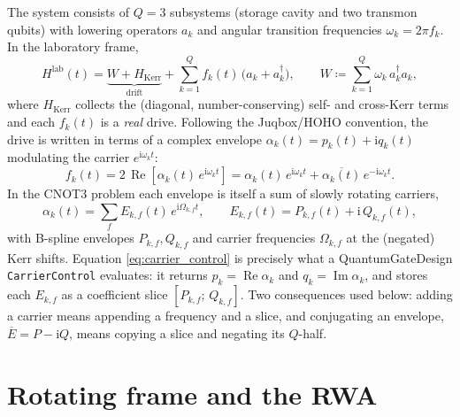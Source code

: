 \documentclass[11pt]{article}
\newcommand{\ii}{\mathrm{i}}
\renewcommand{\Re}{\operatorname{Re}}
\renewcommand{\Im}{\operatorname{Im}}
\newcommand{\code}[1]{\texttt{#1}}
\begin{document}
The system consists of $Q = 3$ subsystems (storage cavity and two transmon
qubits) with lowering operators $a_k$ and angular transition frequencies
$\omega_k = 2\pi f_k$.  In the laboratory frame,
\begin{equation} \label{eq:lab_hamiltonian}
    H^{\mathrm{lab}}(t)
    = \underbrace{W + H_{\mathrm{Kerr}}}_{\text{drift}}
    + \sum_{k=1}^{Q} f_k(t)\,\bigl(a_k + a_k^\dagger\bigr),
    \qquad
    W \coloneqq \sum_{k=1}^{Q} \omega_k\, a_k^\dagger a_k,
\end{equation}
where $H_{\mathrm{Kerr}}$ collects the (diagonal, number-conserving) self- and
cross-Kerr terms and each $f_k(t)$ is a \emph{real} drive.  Following the
Juqbox/HOHO convention, the drive is written in terms of a complex envelope
$\alpha_k(t) = p_k(t) + \ii q_k(t)$ modulating the carrier $e^{\ii\omega_k t}$:
\begin{equation} \label{eq:lab_pulse}
    f_k(t)
    = 2\,\Re\!\left[\alpha_k(t)\, e^{\ii \omega_k t}\right]
    = \alpha_k(t)\, e^{\ii \omega_k t} + \overline{\alpha_k(t)}\, e^{-\ii \omega_k t}.
\end{equation}
In the CNOT3 problem each envelope is itself a sum of slowly rotating
carriers,
\begin{equation} \label{eq:carrier_control}
    \alpha_k(t) = \sum_{f} E_{k,f}(t)\, e^{\ii \Omega_{k,f} t},
    \qquad
    E_{k,f}(t) = P_{k,f}(t) + \ii\, Q_{k,f}(t),
\end{equation}
with B-spline envelopes $P_{k,f}, Q_{k,f}$ and carrier frequencies
$\Omega_{k,f}$ at the (negated) Kerr shifts.  Equation
\eqref{eq:carrier_control} is precisely what a QuantumGateDesign
\code{CarrierControl} evaluates: it returns
$p_k = \Re \alpha_k$ and $q_k = \Im \alpha_k$, and stores each $E_{k,f}$ as a
coefficient slice $[P_{k,f};\, Q_{k,f}]$.  Two consequences used below:
adding a carrier means appending a frequency and a slice, and conjugating an
envelope, $\overline{E} = P - \ii Q$, means copying a slice and negating its
$Q$-half.

\section{Rotating frame and the RWA}
\end{document}
